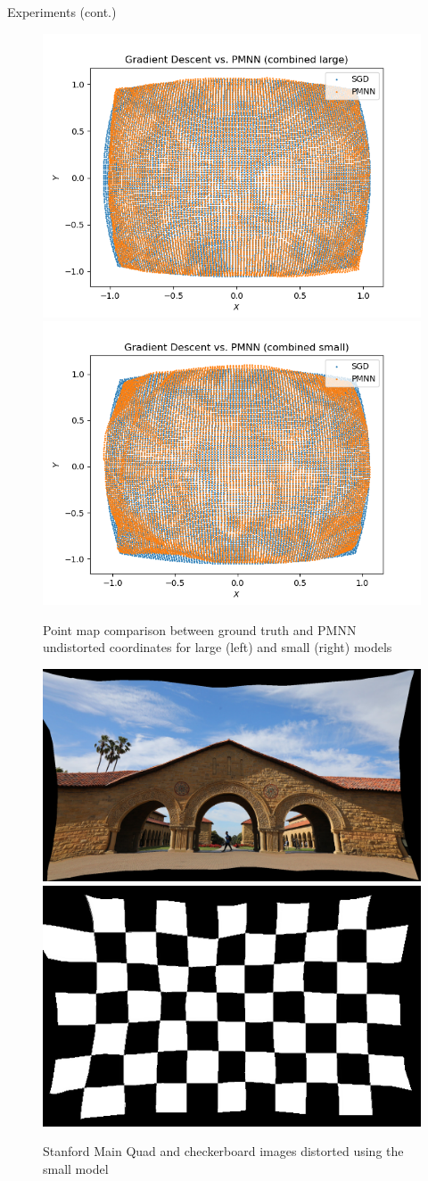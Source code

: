 \documentclass[final]{beamer}
\newlength{\colwidth}
\begin{document}
\begin{frame}[t]
\begin{columns}[t]
    \begin{column}{\colwidth}
      \begin{block}{Experiments (cont.)}
        \begin{figure}
          \includegraphics[width=0.48\columnwidth]{images/combined_large_pointmap.png}
          \includegraphics[width=0.48\columnwidth]{images/combined_small_pointmap.png}
          \caption{Point map comparison between ground truth and PMNN undistorted coordinates for large (left) and small (right) models}
        \end{figure}

        \begin{figure}
          \includegraphics[width=0.48\columnwidth]{images/combined_stanford.png}
          \includegraphics[width=0.44\columnwidth]{images/combined_checkerboard.png}
          \caption{Stanford Main Quad and checkerboard images distorted using the small model}
        \end{figure}
      \end{block}


\end{column}
\end{columns}
\end{frame}
\end{document}

